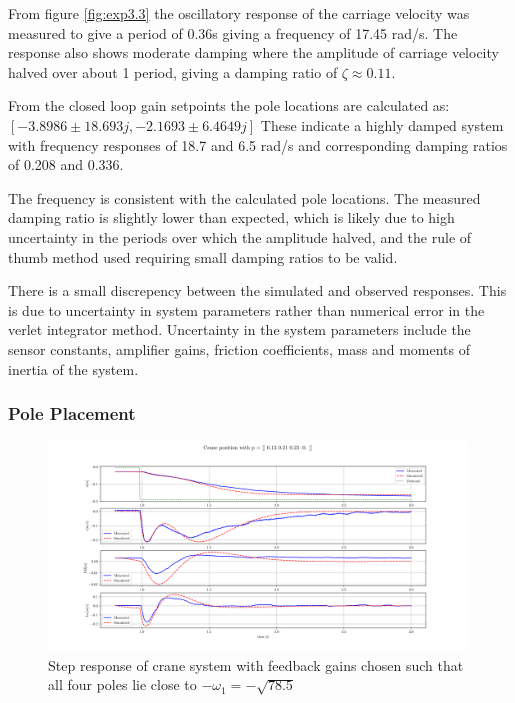 \documentclass{article}
\begin{document}
From figure \ref{fig:exp3.3} the oscillatory response of the carriage velocity was measured to give a period of 0.36s giving a frequency of 17.45 rad/s.
The response also shows moderate damping where the amplitude of carriage velocity halved over about 1 period, giving a damping ratio of $\zeta \approx 0.11$.

From the closed loop gain setpoints the pole locations are calculated as: \\
$[-3.8986 \pm 18.693j, -2.1693 \pm 6.4649j]$
These indicate a highly damped system with frequency responses of 18.7 and 6.5 rad/s and corresponding damping ratios of 0.208 and 0.336.

The frequency is consistent with the calculated pole locations. The measured damping ratio is slightly lower than expected, 
which is likely due to high uncertainty in the periods over which the amplitude halved, and the rule of thumb method used requiring small damping ratios to be valid.

There is a small discrepency between the simulated and observed responses. This is due to uncertainty in system parameters rather than numerical error in the verlet integrator method.
Uncertainty in the system parameters include the sensor constants, amplifier gains, friction coefficients, mass and moments of inertia of the system.

\subsubsection{Pole Placement}

\begin{figure}[H]
  \centering
  \includegraphics[width=0.99\textwidth]{figures/3.4a.png}
  \caption{Step response of crane system with feedback gains chosen such that all four poles lie close to $-\omega_1 = -\sqrt{78.5}$}
  \label{fig:exp3.4a}
\end{figure}
\end{document}

